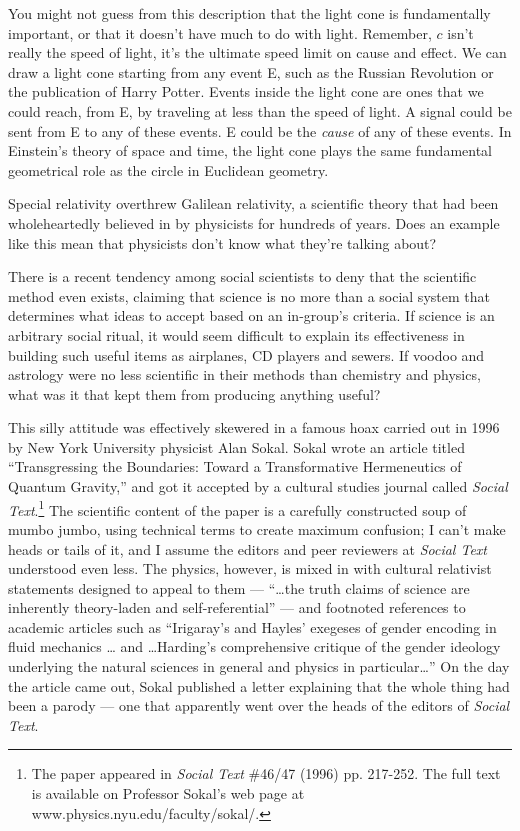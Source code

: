 You might not guess from this description that the light cone is fundamentally important, or that it
doesn't have much to do with light. Remember, $c$ isn't really the speed of light, it's the ultimate
speed limit on cause and effect. We can draw a light cone starting from any event E, such as the
Russian Revolution or the publication of Harry Potter. Events inside the light cone are ones that we could
reach, from E, by traveling at less than the speed of light. A signal could be sent from E to any of these
events. E could be the \emph{cause} of any of these events.
In Einstein's theory of space and time, the light cone plays the same fundamental geometrical role
as the circle in Euclidean geometry.

\pagebreak


Special relativity overthrew Galilean relativity, a scientific theory that had been wholeheartedly believed in by
physicists for hundreds of years.
Does an example like this mean that physicists don't know what they're talking about?

There is a recent tendency among social scientists to 
deny that the scientific method even exists, claiming that
science is no more than a social system that
determines what ideas to accept based on an in-group's
criteria. If science is an
arbitrary social ritual, it would seem difficult to explain
its effectiveness in building such useful items as
airplanes, CD players and sewers. If voodoo
and astrology were no less scientific in
their methods than chemistry and physics, what was it that
kept them from producing anything useful?

This silly attitude was effectively skewered in a famous hoax
carried out in 1996 by New York University physicist Alan Sokal. Sokal wrote
an article titled ``Transgressing the Boundaries: Toward a Transformative 
Hermeneutics of Quantum Gravity,'' and got it accepted by a cultural studies
journal called \emph{Social Text}.\footnote{The paper
appeared in \emph{Social Text} \#46/47 (1996) pp. 217-252. The full text
is available on Professor Sokal's web page at www.physics.nyu.edu/faculty/sokal/.}
The scientific content of the paper is a carefully constructed soup of
mumbo jumbo, using technical terms to create maximum confusion; I can't make
heads or tails of it, and I assume the editors and peer reviewers at
\emph{Social Text} understood even less. The physics, however, is mixed
in with cultural relativist statements designed to appeal to them ---
``\ldots the truth claims of science are inherently theory-laden and self-referential'' ---
and footnoted references to academic articles such as 
``Irigaray's and Hayles' exegeses of gender encoding in fluid mechanics \ldots
and \ldots Harding's comprehensive critique of the gender ideology underlying
the natural sciences in general and physics in particular\ldots''
On the day the article came out, Sokal published a letter explaining that
the whole thing had been a parody --- one that apparently went over the heads
of the editors of \emph{Social Text}.

